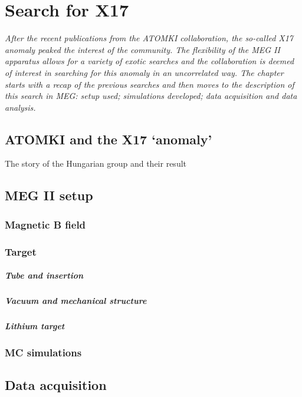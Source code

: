 \chapter{Search for X17}
\begin{refsection}
\label{ch:X17}
{\itshape After the recent publications from the ATOMKI collaboration, the so-called X17 anomaly peaked the interest of the community. The flexibility of the MEG II apparatus allows for a variety of exotic searches and the collaboration is deemed of interest in searching for this anomaly in an uncorrelated way.
The chapter starts with a recap of the previous searches and then moves to the description of this search in MEG: setup used; simulations developed; data acquisition and data analysis.}

\section{ATOMKI and the X17 `anomaly'}
The story of the Hungarian group and their result
\section{MEG II setup}
\subsection{Magnetic \textbf{B} field}
\subsection{Target}
\paragraph{Tube and insertion}
\paragraph{Vacuum and mechanical structure}
\paragraph{Lithium target}
\subsection{MC simulations}
\section{Data acquisition}

\end{refsection}

